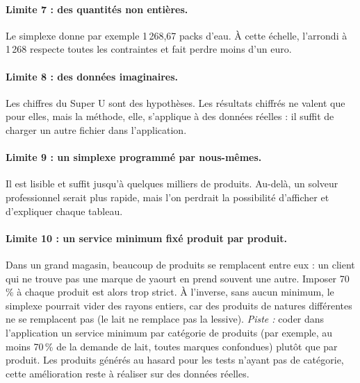 \documentclass[11pt,a4paper]{article}
\begin{document}
\paragraph{Limite 7 : des quantités non entières.} Le simplexe donne par exemple 1\,268,67
packs d'eau. À cette échelle, l'arrondi à 1\,268 respecte toutes les contraintes et fait
perdre moins d'un euro.

\paragraph{Limite 8 : des données imaginaires.} Les chiffres du Super U sont des hypothèses.
Les résultats chiffrés ne valent que pour elles, mais la méthode, elle, s'applique à des
données réelles : il suffit de charger un autre fichier dans l'application.

\paragraph{Limite 9 : un simplexe programmé par nous-mêmes.} Il est lisible et suffit jusqu'à
quelques milliers de produits. Au-delà, un solveur professionnel serait plus rapide, mais l'on
perdrait la possibilité d'afficher et d'expliquer chaque tableau.

\paragraph{Limite 10 : un service minimum fixé produit par produit.} Dans un grand magasin,
beaucoup de produits se remplacent entre eux : un client qui ne trouve pas une marque de yaourt
en prend souvent une autre. Imposer 70\,\% à chaque produit est alors trop strict. À l'inverse,
sans aucun minimum, le simplexe pourrait vider des rayons entiers, car des produits de natures
différentes ne se remplacent pas (le lait ne remplace pas la lessive). \emph{Piste :} coder dans
l'application un service minimum par catégorie de produits (par exemple, au moins 70\,\% de la
demande de lait, toutes marques confondues) plutôt que par produit. Les produits générés au
hasard pour les tests n'ayant pas de catégorie, cette amélioration reste à réaliser sur des
données réelles.

\end{document}
